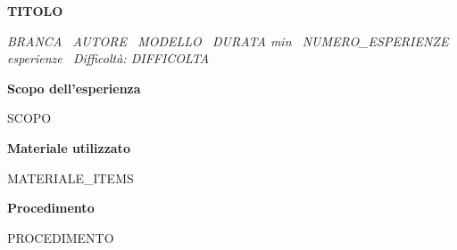 \documentclass[11pt,a4paper]{article}
\begin{document}
{\LARGE\bfseries {{TITOLO}}\par}
\vspace{2pt}
{\small\itshape
  {{BRANCA}} \textperiodcentered\ {{AUTORE}} \textperiodcentered\ {{MODELLO}}
  \textperiodcentered\ {{DURATA}} min
  \textperiodcentered\ {{NUMERO_ESPERIENZE}} esperienze
  \textperiodcentered\ Difficoltà: {{DIFFICOLTA}}\par
}

\vspace{14pt}
{\bfseries Scopo dell'esperienza}\par
{{SCOPO}}

\vspace{10pt}
{\bfseries Materiale utilizzato}
\begin{itemize}
{{MATERIALE_ITEMS}}
\end{itemize}

\vspace{10pt}
{\bfseries Procedimento}\par
{{PROCEDIMENTO}}
\end{document}
